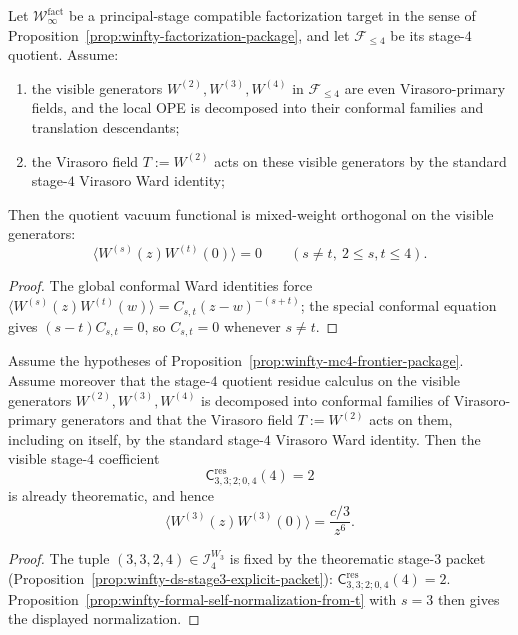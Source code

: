 \begin{proposition}
\label{prop:winfty-stage4-visible-orthogonality}
Let $\mathcal{W}^{\mathrm{fact}}_\infty$ be a principal-stage
compatible factorization target in the sense of
Proposition~\ref{prop:winfty-factorization-package}, and let
$\mathcal{F}_{\le 4}$ be its stage-$4$ quotient.  Assume:
\begin{enumerate}[label=\textup{(\roman*)}]
\item the visible generators $W^{(2)},W^{(3)},W^{(4)}$ in
  $\mathcal{F}_{\le 4}$ are even Virasoro-primary fields, and the local
  OPE is decomposed into their conformal families and translation
  descendants;
\item the Virasoro field $T:=W^{(2)}$ acts on these visible generators
  by the standard stage-$4$ Virasoro Ward identity;
\end{enumerate}
Then the quotient vacuum functional is mixed-weight orthogonal on the
visible generators:
\[
\langle W^{(s)}(z)W^{(t)}(0)\rangle = 0
\qquad (s\neq t,\ 2\le s,t\le 4).
\]
\end{proposition}

\begin{proof}
The global conformal Ward identities force
$\langle W^{(s)}(z)W^{(t)}(w)\rangle = C_{s,t}(z-w)^{-(s+t)}$;
the special conformal equation gives $(s-t)C_{s,t}=0$,
so $C_{s,t}=0$ whenever $s\neq t$.
\end{proof}

\begin{proposition}
\label{prop:winfty-stage4-visible-w3-normalization}
Assume the hypotheses of
Proposition~\ref{prop:winfty-mc4-frontier-package}.  Assume moreover
that the stage-$4$ quotient residue calculus on the visible generators
$W^{(2)},W^{(3)},W^{(4)}$ is decomposed into conformal families of
Virasoro-primary generators and that the Virasoro field $T:=W^{(2)}$
acts on them, including on itself, by the standard stage-$4$
Virasoro Ward identity.  Then the visible stage-$4$ coefficient
\[
\mathsf{C}^{\mathrm{res}}_{3,3;2;0,4}(4)=2
\]
is already theorematic, and hence
\[
\langle W^{(3)}(z)W^{(3)}(0)\rangle=\frac{c/3}{z^{6}}.
\]
\end{proposition}

\begin{proof}
The tuple $(3,3,2,4)\in\mathcal{I}_4^{W_3}$ is fixed by the theorematic stage-$3$ packet (Proposition~\ref{prop:winfty-ds-stage3-explicit-packet}): $\mathsf{C}^{\mathrm{res}}_{3,3;2;0,4}(4)=2$.  Proposition~\ref{prop:winfty-formal-self-normalization-from-t} with $s=3$ then gives the displayed normalization.
\end{proof}

